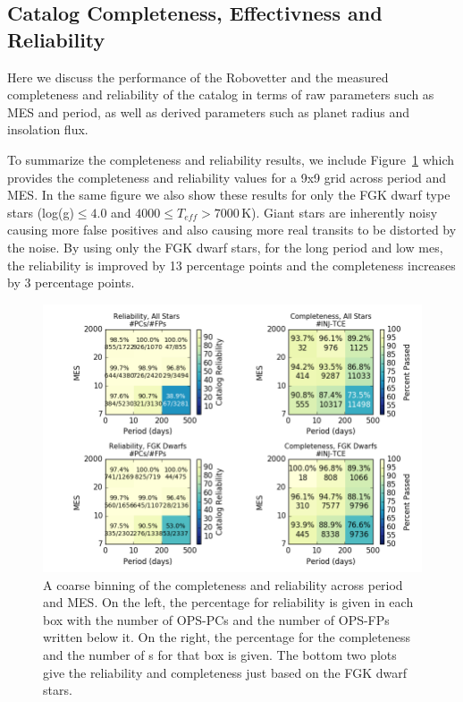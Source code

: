 \subsection{Catalog Completeness, Effectivness and Reliability}
\label{s:candr}

Here we discuss the performance of the Robovetter and the measured completeness and reliability of the catalog in terms of raw parameters such as MES and period, as well as derived parameters such as planet radius and insolation flux.  

To summarize the completeness and reliability results, we include Figure~\ref{f:scoregrid} which provides the completeness and reliability values for a 9x9 grid across period and MES. In the same figure we also show these results for only the FGK dwarf type stars (log(g)$\leq4.0$ and $4000 \leq T_{eff} > 7000$\,K). Giant stars are inherently noisy causing more false positives and also causing more real transits to be distorted by the noise.  By using only the FGK dwarf stars, for the long period and low mes, the reliability is improved by 13 percentage points and the completeness increases by 3 percentage points.

\begin{figure}[h!]
\begin{center}
\includegraphics[width=0.95\linewidth]{fig-completeReliabilityCard.png}
\caption{ A coarse binning of the completeness and reliability across period and MES. On the left, the percentage for reliability is given in each box with the number of OPS-PCs and the number of OPS-FPs written below it.  On the right, the percentage for the completeness and the number of \injtce s for that box is given. The bottom two plots give the reliability and completeness just based on the FGK dwarf stars. }
\label{f:scoregrid}
\end{center}
\end{figure}


